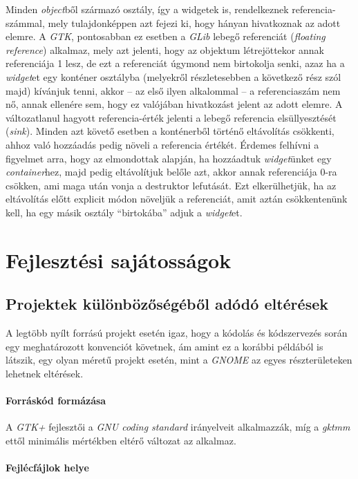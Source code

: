 Minden \textit{object}ből származó osztály, így a widgetek is, rendelkeznek referencia-számmal, mely tulajdonképpen azt fejezi ki, hogy hányan hivatkoznak az adott elemre. A \textit{GTK}, pontosabban ez esetben a \textit{GLib} lebegő referenciát (\textit{floating reference}) alkalmaz, mely azt jelenti, hogy az objektum létrejöttekor annak referenciája 1 lesz, de ezt a referenciát úgymond nem birtokolja senki, azaz ha a \textit{widget}et egy konténer osztályba (melyekről részletesebben a következő rész szól majd) kívánjuk tenni, akkor -- az első ilyen alkalommal -- a referenciaszám nem nő, annak ellenére sem, hogy ez valójában hivatkozást jelent az adott elemre. A változatlanul hagyott referencia-érték jelenti a lebegő referencia elsüllyesztését (\textit{sink}). Minden azt követő esetben a konténerből történő eltávolítás csökkenti, ahhoz való hozzáadás pedig növeli a referencia értékét. Érdemes felhívni a figyelmet arra, hogy az elmondottak alapján, ha hozzáadtuk \textit{widget}ünket egy \textit{container}hez, majd pedig eltávolítjuk belőle azt, akkor annak referenciája 0-ra csökken, ami maga után vonja a destruktor lefutását. Ezt elkerülhetjük, ha az eltávolítás előtt explicit módon növeljük a referenciát, amit aztán csökkentenünk kell, ha egy másik osztály ``birtokába'' adjuk a \textit{widget}et.

\section{Fejlesztési sajátosságok}

\subsection{Projektek különbözőségéből adódó eltérések}

A legtöbb nyílt forrású projekt esetén igaz, hogy a kódolás és kódszervezés során egy meghatározott konvenciót követnek, ám amint ez a korábbi példából is látszik, egy olyan méretű projekt esetén, mint a \textit{GNOME} az egyes részterületeken lehetnek eltérések.

\paragraph{Forráskód formázása}

A \textit{GTK+} fejlesztői a \textit{GNU coding standard} irányelveit alkalmazzák, míg a \textit{gktmm} ettől minimális mértékben eltérő változat az alkalmaz.

\paragraph{Fejlécfájlok helye}

